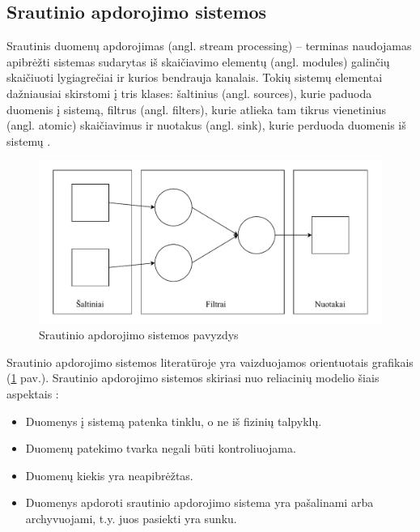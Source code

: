 \documentclass{VUMIFPSbakalaurinis}
\begin{document}
\subsection{Srautinio apdorojimo sistemos}
Srautinis duomenų apdorojimas (angl. stream processing) – terminas naudojamas apibrėžti sistemas sudarytas iš skaičiavimo elementų (angl. modules) galinčių skaičiuoti lygiagrečiai ir kurios bendrauja kanalais. Tokių sistemų elementai dažniausiai skirstomi į tris klases: šaltinius (angl. sources), kurie paduoda duomenis į sistemą, filtrus (angl. filters), kurie atlieka tam tikrus vienetinius (angl. atomic) skaičiavimus ir nuotakus (angl. sink), kurie perduoda duomenis iš sistemų \cite{stephens1997survey}. 
\begin{figure}[H]
    \includegraphics[width=15cm]{img/Srautinio apdorojimo sistema.pdf}
    \caption{Srautinio apdorojimo sistemos pavyzdys}
    \label{srautinio-apdorojimo-sistema}
\end{figure} 
Srautinio apdorojimo sistemos literatūroje yra vaizduojamos orientuotais grafikais (\ref{srautinio-apdorojimo-sistema} pav.). Srautinio apdorojimo sistemos skiriasi nuo reliacinių modelio šiais aspektais \cite{babcock2002models}: 
\begin{itemize}
    \item Duomenys į sistemą patenka tinklu, o ne iš fizinių talpyklų.
    \item Duomenų patekimo tvarka negali būti kontroliuojama.
    \item Duomenų kiekis yra neapibrėžtas.
    \item Duomenys apdoroti srautinio apdorojimo sistema yra pašalinami arba archyvuojami, t.y. juos pasiekti yra sunku. 
\end{itemize}
\end{document}
